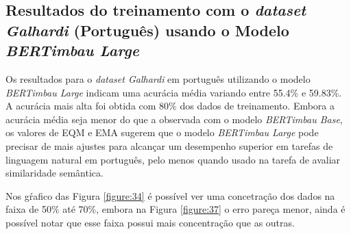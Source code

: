 \subsection{Resultados do treinamento com o \textit{dataset Galhardi} (Português) usando o Modelo \textit{BERTimbau Large}}

Os resultados para o \textit{dataset Galhardi} em português utilizando o modelo \textit{BERTimbau Large} indicam uma acurácia média variando entre 55.4\% e 59.83\%. A acurácia mais alta foi obtida com 80\% dos dados de treinamento. Embora a acurácia média seja menor do que a observada com o modelo \textit{BERTimbau Base}, os valores de EQM e EMA sugerem que o modelo \textit{BERTimbau Large} pode precisar de mais ajustes para alcançar um desempenho superior em tarefas de linguagem natural em português, pelo menos quando usado na tarefa de avaliar similaridade semântica.

\begin{table}[h!]
\centering
{}
\caption{Resultados de Regressão para Diferentes Percentuais de Treino com o \textit{dataset Galhardi} (Português) usando o Modelo \textit{BERTimbau Large}}
\label{tab:resultados_regressao_portugues_large}
\end{table}

Nos gŕafico das Figura \ref{figure:34} é possível ver uma concetração dos dados na faixa de 50\% até 70\%, embora na Figura \ref{figure:37} o erro pareça menor, ainda é possível notar que esse faixa possui mais concentração que as outras.



\FloatBarrier